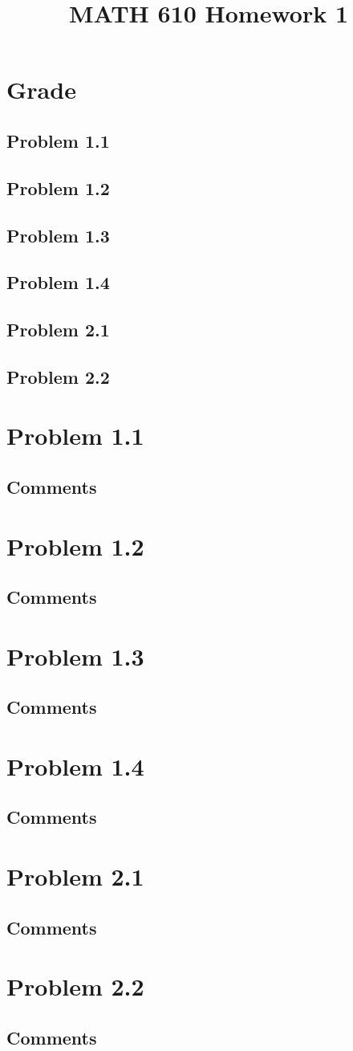 \documentclass{article}
\title{MATH 610 Homework 1}
\author{
}
\date{}
\newcommand{\problem}[2]{
    \section*{Problem #1}
    {#2}
    \vfill
    \subsection*{Comments}
    \newpage
}
\begin{document}
\maketitle
\newpage

\section*{Grade}
\subsection*{Problem 1.1}
\subsection*{Problem 1.2}
\subsection*{Problem 1.3}
\subsection*{Problem 1.4}
\subsection*{Problem 2.1}
\subsection*{Problem 2.2}
\newpage

\problem{1.1}{
}

\problem{1.2}{
}

\problem{1.3}{
}

\problem{1.4}{
}

\problem{2.1}{
}

\problem{2.2}{
}
\end{document}
